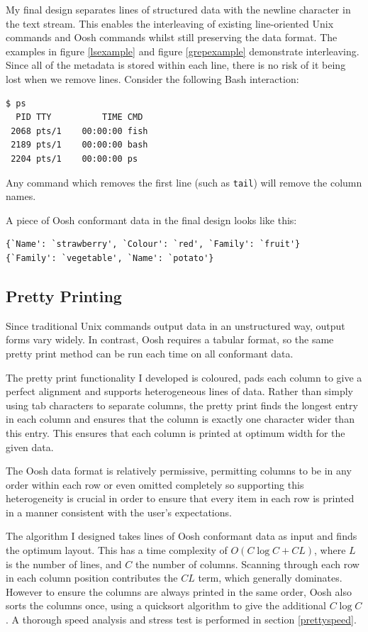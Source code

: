 \documentclass[12pt,twoside,notitlepage]{report}
\begin{document}
My final design separates lines of structured data with the newline
character in the text stream. This enables the interleaving of
existing line-oriented Unix commands and Oosh commands whilst still
preserving the data format. The examples in figure \ref{lsexample} and
figure \ref{grepexample} demonstrate interleaving. Since all of the
metadata is stored within each line, there is no risk of it being lost
when we remove lines. Consider the following Bash interaction:

\begin{verbatim}
$ ps
  PID TTY          TIME CMD
 2068 pts/1    00:00:00 fish
 2189 pts/1    00:00:00 bash
 2204 pts/1    00:00:00 ps
\end{verbatim}

Any command which removes the first line (such as {\tt tail}) will remove
the column names.

A piece of Oosh conformant data in the final design looks like this:

\begin{verbatim}
{`Name': `strawberry', `Colour': `red', `Family': `fruit'}
{`Family': `vegetable', `Name': `potato'}
\end{verbatim}

\subsection{Pretty Printing}
\label{prettyimpl}
Since traditional Unix commands output data in an unstructured way,
output forms vary widely. In contrast, Oosh requires a tabular format,
so the same pretty print method can be run each time on all conformant
data.

The pretty print functionality I developed is coloured, pads each
column to give a perfect alignment and supports heterogeneous lines of
data. Rather than simply using tab characters to separate columns, the
pretty print finds the longest entry in each column and ensures that
the column is exactly one character wider than this entry. This
ensures that each column is printed at optimum width for the given
data.

The Oosh data format is relatively permissive, permitting columns to
be in any order within each row or even omitted completely so
supporting this heterogeneity is crucial in order to ensure that every
item in each row is printed in a manner consistent with the user's
expectations.

The algorithm I designed takes lines of Oosh conformant data as input
and finds the optimum layout. This has a time complexity of $O(C \log
C + CL)$, where $L$ is the number of lines, and $C$ the number of
columns. Scanning through each row in each column position contributes
the $CL$ term, which generally dominates. However to ensure the
columns are always printed in the same order, Oosh also sorts the
columns once, using a quicksort algorithm to give the additional $C
\log C$. A thorough speed analysis and stress test is performed in
section \ref{prettyspeed}.
\end{document}
